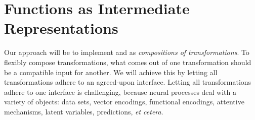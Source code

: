 \documentclass[12pt, twoside]{report}
\begin{document}
\section{Functions as Intermediate Representations}
\label{sec:software:functions}

Our approach will be to implement  and  as \emph{compositions of transformations}.
To flexibly compose transformations, what comes out of one transformation should be a compatible input for another.
We will achieve this by letting all transformations adhere to an agreed-upon interface.
Letting all transformations adhere to one interface is challenging, because
neural processes deal with a variety of objects:
data sets, vector encodings, functional encodings, attentive mechanisms, latent variables, predictions,
\textit{et cetera}.
\end{document}
